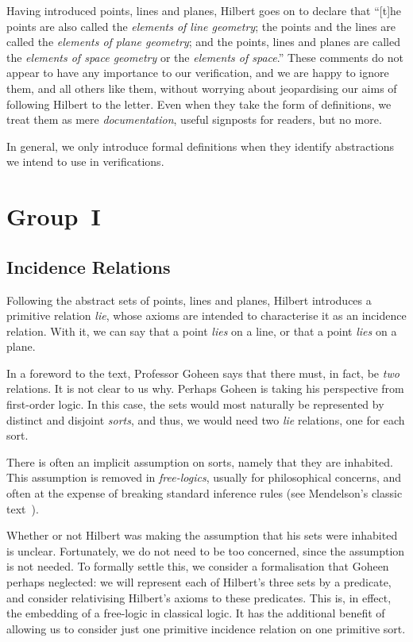Having introduced points, lines and planes, Hilbert goes on to declare that ``[t]he points are also called the \emph{elements of line geometry}; the points and the lines are called the \emph{elements of plane geometry}; and the points, lines and planes are called the \emph{elements of space geometry} or the \emph{elements of space}.'' These comments do not appear to have any importance to our verification, and we are happy to ignore them, and all others like them, without worrying about jeopardising our aims of following Hilbert to the letter. Even when they take the form of definitions, we treat them as mere \emph{documentation}, useful signposts for readers, but no more.

In general, we only introduce formal definitions when they identify abstractions we intend to use in verifications.

\section{Group~I}
\subsection{Incidence Relations}
Following the abstract sets of points, lines and planes, Hilbert introduces a primitive  relation \emph{lie}, whose axioms are intended to characterise it as an incidence relation. With it, we can say that a point \emph{lies} on a line, or that a point \emph{lies} on a plane.

In a foreword to the text, Professor Goheen says that there must, in fact, be \emph{two} relations. It is not clear to us why. Perhaps Goheen is taking his perspective from first-order logic. In this case, the sets would most naturally be represented by distinct and disjoint \emph{sorts}, and thus, we would need two \emph{lie} relations, one for each sort.

There is often an implicit assumption on sorts, namely that they are inhabited. This assumption is removed in \emph{free-logics}, usually for philosophical concerns, and often at the expense of breaking standard inference rules (see Mendelson's classic text~\cite{Mendelson}).

Whether or not Hilbert was making the assumption that his sets were inhabited is unclear. Fortunately, we do not need to be too concerned, since the assumption is not needed. To formally settle this, we consider a formalisation that Goheen perhaps neglected: we will represent each of Hilbert's three sets by a predicate, and consider relativising Hilbert's axioms to these predicates. This is, in effect, the embedding of a free-logic in classical logic. It has the additional benefit of allowing us to consider just one primitive incidence relation on one primitive sort.


